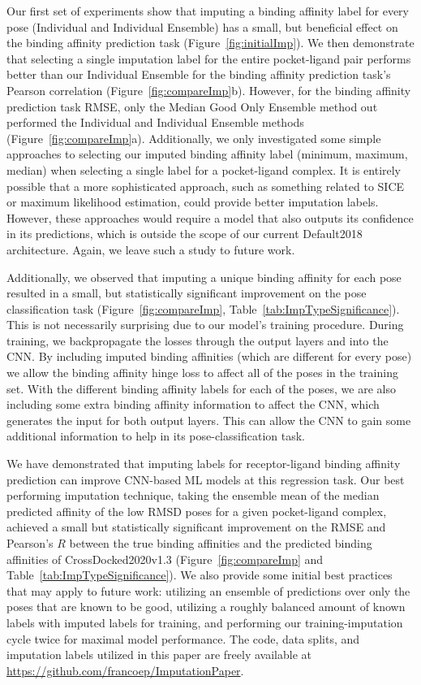\documentclass[journal=jmcmar,manuscript=article]{achemso}
\begin{document}
Our first set of experiments show that imputing a binding affinity label for every pose (Individual and Individual Ensemble) has a small, but beneficial effect on the binding affinity prediction task (Figure~\ref{fig:initialImp}).
We then demonstrate that selecting a single imputation label for the entire pocket-ligand pair performs better than our Individual Ensemble for the binding affinity prediction task's Pearson correlation (Figure~\ref{fig:compareImp}b).
However, for the binding affinity prediction task RMSE, only the Median Good Only Ensemble method out performed the Individual and Individual Ensemble methods (Figure~\ref{fig:compareImp}a).
Additionally, we only investigated some simple approaches to selecting our imputed binding affinity label (minimum, maximum, median) when selecting a single label for a pocket-ligand complex.
It is entirely possible that a more sophisticated approach, such as something related to SICE\cite{SICE} or maximum likelihood estimation, could provide better imputation labels.
However, these approaches would require a model that also outputs its confidence in its predictions, which is outside the scope of our current Default2018 architecture.
Again, we leave such a study to future work.

Additionally, we observed that imputing a unique binding affinity for each pose resulted in a small, but statistically significant improvement on the pose classification task (Figure~\ref{fig:compareImp}, Table~\ref{tab:ImpTypeSignificance}).
This is not necessarily surprising due to our model's training procedure.
During training, we backpropagate the losses through the output layers and into the CNN.
By including imputed binding affinities (which are different for every pose) we allow the binding affinity hinge loss to affect all of the poses in the training set.
With the different binding affinity labels for each of the poses, we are also including some extra binding affinity information to affect the CNN, which generates the input for both output layers.
This can allow the CNN to gain some additional information to help in its pose-classification task.


We have demonstrated that imputing labels for receptor-ligand binding affinity prediction can improve CNN-based ML models at this regression task.
Our best performing imputation technique, taking the ensemble mean of the median predicted affinity of the low RMSD poses for a given pocket-ligand complex, achieved a small but statistically significant improvement on the RMSE and Pearson's $R$ between the true binding affinities and the predicted binding affinities of CrossDocked2020v1.3 (Figure~\ref{fig:compareImp} and Table~\ref{tab:ImpTypeSignificance}).
We also provide some initial best practices that may apply to future work: utilizing an ensemble of predictions over only the poses that are known to be good, utilizing a roughly balanced amount of known labels with imputed labels for training, and performing our training-imputation cycle twice for maximal model performance.
The code, data splits, and imputation labels utilized in this paper are freely available at \url{https://github.com/francoep/ImputationPaper}.
\end{document}
